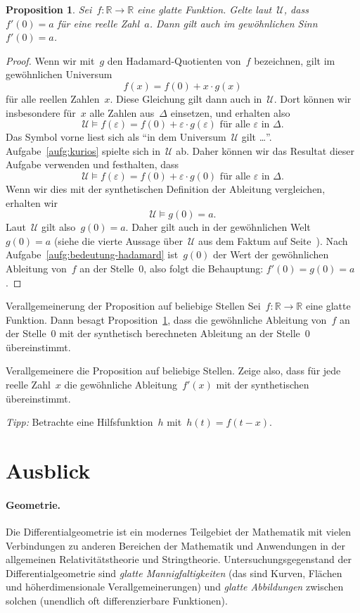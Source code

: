 \documentclass[twoside]{../zirkelblatt}
\newcommand{\RR}{\mathbb{R}}
\newcommand{\U}{\mathcal{U}}
\theoremstyle{definition}
\theoremstyle{plain}
\newtheorem{prop}[defn]{Proposition}
\theoremstyle{remark}
\begin{document}
\begin{prop}\label{prop:ableitung-sdg-gew}
Sei~$f : \RR \to \RR$ eine glatte Funktion. Gelte laut~$\U$,
dass~$f'(0) = a$ für eine reelle Zahl~$a$. Dann gilt auch im gewöhnlichen
Sinn~$f'(0) = a$.
\end{prop}
\begin{proof}Wenn wir mit~$g$ den Hadamard-Quotienten von~$f$ bezeichnen, gilt
im gewöhnlichen Universum
\[ f(x) = f(0) + x \cdot g(x) \]
für alle reellen Zahlen~$x$. Diese Gleichung gilt dann auch in~$\U$. Dort
können wir insbesondere für~$x$ alle Zahlen aus~$\Delta$ einsetzen, und
erhalten also
\[ \U \models \text{$f(\varepsilon) = f(0) + \varepsilon \cdot g(\varepsilon)$ für
alle~$\varepsilon$ in~$\Delta$.} \]
Das Symbol vorne liest sich als "`in dem Universum~$\U$ gilt \ldots"'.
Aufgabe~\ref{aufg:kurios} spielte sich in~$\U$ ab. Daher können wir das
Resultat dieser Aufgabe verwenden und festhalten, dass
\[ \U \models \text{$f(\varepsilon) = f(0) + \varepsilon \cdot g(0)$ für
alle~$\varepsilon$ in~$\Delta$.} \]
Wenn wir dies mit der synthetischen Definition der Ableitung vergleichen,
erhalten wir
\[ \U \models g(0) = a. \]
Laut~$\U$ gilt also~$g(0) = a$. Daher gilt auch in der gewöhnlichen Welt~$g(0)
= a$ (siehe die vierte Aussage über~$\U$ aus dem Faktum auf Seite~\pageref{fact:sdg-universum}). Nach
Aufgabe~\ref{aufg:bedeutung-hadamard} ist~$g(0)$ der Wert der gewöhnlichen
Ableitung von~$f$ an der Stelle~$0$, also folgt die Behauptung: $f'(0) = g(0) =
a$.
\end{proof}

\begin{aufgabeShaded}{Verallgemeinerung der Proposition auf beliebige Stellen}
Sei~$f : \RR \to \RR$ eine glatte Funktion. Dann besagt
Proposition~\ref{prop:ableitung-sdg-gew}, dass die gewöhnliche Ableitung
von~$f$ an der Stelle~$0$ mit der synthetisch berechneten Ableitung an der
Stelle~$0$ übereinstimmt.

Verallgemeinere die Proposition auf beliebige Stellen. Zeige also, dass für
jede reelle Zahl~$x$ die gewöhnliche Ableitung~$f'(x)$ mit der synthetischen
übereinstimmt.

\emph{Tipp:} Betrachte eine Hilfsfunktion~$h$ mit~$h(t) = f(t-x)$.
\end{aufgabeShaded}


\section{Ausblick}

\paragraph{Geometrie.} Die Differentialgeometrie ist ein modernes Teilgebiet
der Mathematik mit vielen Verbindungen zu anderen Bereichen der Mathematik und
Anwendungen in der allgemeinen Relativitätstheorie und Stringtheorie.
Untersuchungsgegenstand der Differentialgeometrie sind \emph{glatte
Mannigfaltigkeiten} (das sind Kurven, Flächen und höherdimensionale
Verallgemeinerungen) und \emph{glatte Abbildungen} zwischen solchen (unendlich
oft differenzierbare Funktionen).
\end{document}
